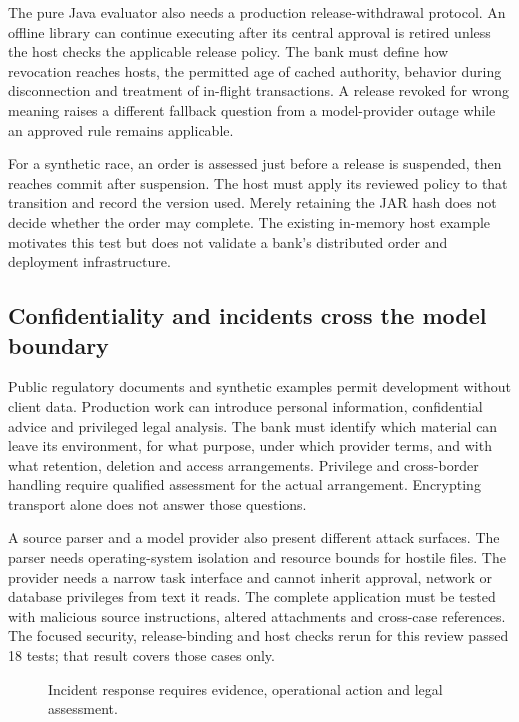 The pure Java evaluator also needs a production release-withdrawal protocol.
An offline library can continue executing after its central approval is retired
unless the host checks the applicable release policy. The bank must define
how revocation reaches hosts, the permitted age of cached authority, behavior
during disconnection and treatment of in-flight transactions. A release revoked
for wrong meaning raises a different fallback question from a model-provider
outage while an approved rule remains applicable.

For a synthetic race, an order is assessed just before a release is suspended,
then reaches commit after suspension. The host must apply its reviewed policy
to that transition and record the version used. Merely retaining the JAR hash
does not decide whether the order may complete. The existing in-memory host
example motivates this test but does not validate a bank's distributed order
and deployment infrastructure.

\subsection{Confidentiality and incidents cross the model boundary}

Public regulatory documents and synthetic examples permit development without
client data. Production work can introduce personal information, confidential
advice and privileged legal analysis. The bank must identify which material can
leave its environment, for what purpose, under which provider terms, and with
what retention, deletion and access arrangements. Privilege and cross-border
handling require qualified assessment for the actual arrangement. Encrypting
transport alone does not answer those questions.

A source parser and a model provider also present different attack surfaces.
The parser needs operating-system isolation and resource bounds for hostile
files. The provider needs a narrow task interface and cannot inherit approval,
network or database privileges from text it reads. The complete application
must be tested with malicious source instructions, altered attachments and
cross-case references. The focused security, release-binding and host checks
rerun for this review passed 18 tests; that result covers those cases only.

\begin{figure}[H]
\centering
{}
\caption{Incident response requires evidence, operational action and legal assessment.}
\label{fig:incident-legal-response}
\end{figure}

